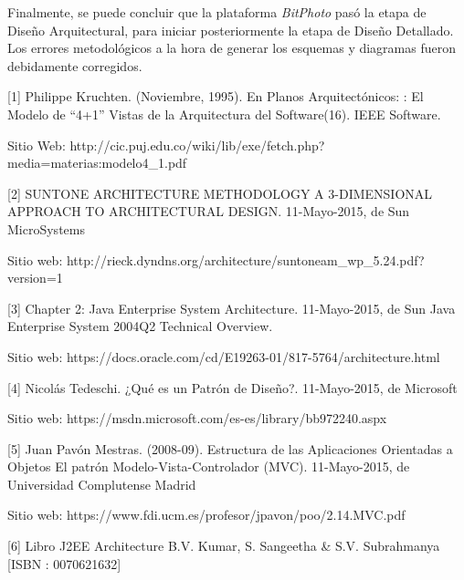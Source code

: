 \documentclass{memoria}
\begin{document}
Finalmente, se puede concluir que la plataforma \textsl{BitPhoto} pasó la etapa de Diseño Arquitectural, para iniciar posteriormente la etapa de Diseño Detallado. Los errores metodológicos a la hora de generar los esquemas y diagramas fueron debidamente corregidos.




[1] Philippe Kruchten. (Noviembre, 1995). En Planos Arquitectónicos: : El Modelo de “4+1” Vistas de la Arquitectura del Software(16). IEEE Software. 

Sitio Web: http://cic.puj.edu.co/wiki/lib/exe/fetch.php?media=materias:modelo4\_1.pdf

[2] SUNTONE ARCHITECTURE METHODOLOGY A 3-DIMENSIONAL APPROACH TO ARCHITECTURAL DESIGN. 11-Mayo-2015, de Sun MicroSystems 

Sitio web: http://rieck.dyndns.org/architecture/suntoneam\_wp\_5.24.pdf?version=1

[3] Chapter 2: Java Enterprise System Architecture. 11-Mayo-2015, de Sun Java Enterprise System 2004Q2 Technical Overview. 

Sitio web: https://docs.oracle.com/cd/E19263-01/817-5764/architecture.html

[4] Nicolás Tedeschi. ¿Qué es un Patrón de Diseño?. 11-Mayo-2015, de Microsoft 

Sitio web: https://msdn.microsoft.com/es-es/library/bb972240.aspx

[5] Juan Pavón Mestras. (2008-09). Estructura de las Aplicaciones Orientadas a Objetos El patrón Modelo-Vista-Controlador (MVC). 11-Mayo-2015, de Universidad Complutense Madrid 

Sitio web: https://www.fdi.ucm.es/profesor/jpavon/poo/2.14.MVC.pdf

[6] Libro J2EE Architecture \- B.V. Kumar, S. Sangeetha \& S.V. Subrahmanya [ISBN : 0070621632]
\end{document}
